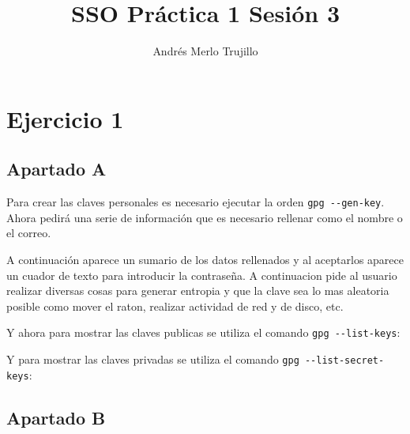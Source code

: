 \documentclass{article}
\title{SSO Práctica 1 Sesión 3}
\author{Andrés Merlo Trujillo}
\date{}
\begin{document}
\maketitle

\tableofcontents

\newpage

\section*{Ejercicio 1}

\subsection*{Apartado A}

Para crear las claves personales es necesario ejecutar la orden \verb|gpg --gen-key|. Ahora pedirá una serie de información que es necesario rellenar como el nombre o el correo.


A continuación aparece un sumario de los datos rellenados y al aceptarlos aparece un cuador de texto para introducir la contraseña. A continuacion pide al usuario realizar diversas cosas para generar entropia y que la clave sea lo mas aleatoria posible como mover el raton, realizar actividad de red y de disco, etc.


Y ahora para mostrar las claves publicas se utiliza el comando \verb|gpg --list-keys|:


Y para mostrar las claves privadas se utiliza el comando \verb|gpg --list-secret-keys|:


\subsection*{Apartado B}
\end{document}
